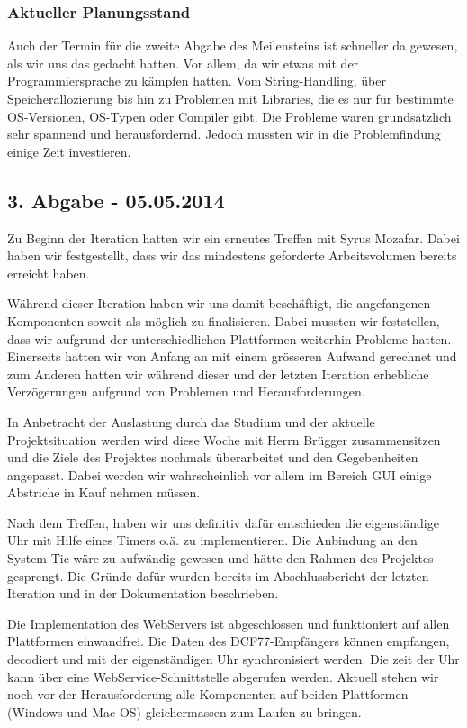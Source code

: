 \subsubsection{Aktueller Planungsstand}
Auch der Termin für die zweite Abgabe des Meilensteins ist schneller da gewesen, als wir uns das gedacht hatten. Vor allem, da wir etwas mit der Programmiersprache zu kämpfen hatten. Vom String-Handling, über Speicherallozierung bis hin zu Problemen mit Libraries, die es nur für bestimmte OS-Versionen, OS-Typen oder Compiler gibt. Die Probleme waren grundsätzlich sehr spannend und herausfordernd. Jedoch mussten wir in die Problemfindung einige Zeit investieren.


\subsection{3. Abgabe - 05.05.2014}
Zu Beginn der Iteration hatten wir ein erneutes Treffen mit Syrus Mozafar. Dabei haben wir festgestellt, dass wir das mindestens geforderte Arbeitsvolumen bereits erreicht haben.

Während dieser Iteration haben wir uns damit beschäftigt, die angefangenen Komponenten soweit als möglich zu finalisieren. Dabei mussten wir feststellen, dass wir aufgrund der unterschiedlichen Plattformen weiterhin Probleme hatten. Einerseits hatten wir von Anfang an mit einem grösseren Aufwand gerechnet und zum Anderen hatten wir während dieser und der letzten Iteration erhebliche Verzögerungen aufgrund von Problemen und Herausforderungen. 

In Anbetracht der Auslastung durch das Studium und der aktuelle Projektsituation werden wird diese Woche mit Herrn Brügger zusammensitzen und die Ziele des Projektes nochmals überarbeitet und den Gegebenheiten angepasst. Dabei werden wir wahrscheinlich vor allem im Bereich GUI einige Abstriche in Kauf nehmen müssen.

Nach dem Treffen, haben wir uns definitiv dafür entschieden die eigenständige Uhr mit Hilfe eines Timers o.ä. zu implementieren. Die Anbindung an den System-Tic wäre zu aufwändig gewesen und hätte den Rahmen des Projektes gesprengt. Die Gründe dafür wurden bereits im Abschlussbericht der letzten Iteration und in der Dokumentation beschrieben.

Die Implementation des WebServers ist abgeschlossen und funktioniert auf allen Plattformen einwandfrei. Die Daten des DCF77-Empfängers können empfangen, decodiert und mit der eigenständigen Uhr synchronisiert werden. Die zeit der Uhr kann über eine WebService-Schnittstelle abgerufen werden. Aktuell stehen wir noch vor der Herausforderung alle Komponenten auf beiden Plattformen (Windows und Mac OS) gleichermassen zum Laufen zu bringen.

